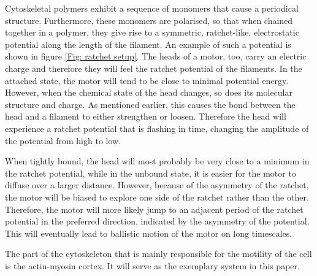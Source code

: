 \documentclass[aps,pre,twocolumn,showpacs,showkeys,a4paper]{revtex4}
\begin{document}
Cytoskeletal polymers exhibit a sequence of monomers that cause a periodical structure. 
Furthermore, these monomers are polarised, so that when chained together in a polymer, they give rise to a symmetric, ratchet-like, electrostatic potential along the length of the filament. 
An example of such a potential is shown in figure \ref{Fig: ratchet setup}. 
The heads of a motor, too, carry an electric charge and therefore they will feel the ratchet potential of the filaments. 
In the attached state, the motor will tend to be close to minimal potential energy. 
However, when the chemical state of the head changes, so does its molecular structure and charge. 
As mentioned earlier, this causes the bond between the head and a filament to either strengthen or loosen. 
Therefore the head will experience a ratchet potential that is flashing in time, changing the amplitude of the potential from high to low.


When tightly bound, the head will most probably be very close to a minimum in the ratchet potential, while in the unbound state, it is easier for the motor to diffuse over a larger distance. 
However, because of the asymmetry of the ratchet, the motor will be biased to explore one side of the ratchet rather than the other. 
Therefore, the motor will more likely jump to an adjacent period of the ratchet potential in the preferred direction, indicated by the asymmetry of the potential. 
This will eventually lead to ballistic motion of the motor on long timescales.


The part of the cytoskeleton that is mainly responsible for the motility of the cell is the actin-myosin cortex.  It will serve as the exemplary system in this paper.
\end{document}
